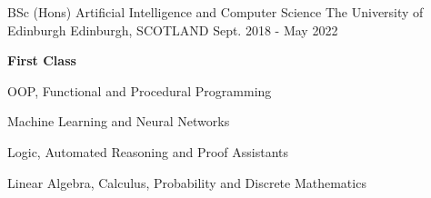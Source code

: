 \begin{cventries}
  \cventry
    {BSc (Hons) Artificial Intelligence and Computer Science} %
    {The University of Edinburgh} %
    {Edinburgh, SCOTLAND} %
    {Sept. 2018 - May 2022} %
    {
        \textbf{First Class}
        \vspace{1.35em}
        \begin{cvitems} %
            \item OOP, Functional and Procedural Programming
            \item Machine Learning and Neural Networks
            \item Logic, Automated Reasoning and Proof Assistants
            \item Linear Algebra, Calculus, Probability and Discrete Mathematics
        \end{cvitems}
    }
\end{cventries}
